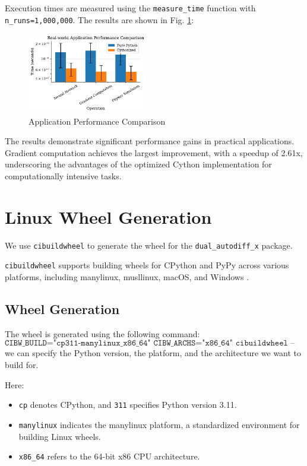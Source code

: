 \documentclass{article}
\begin{document}
Execution times are measured using the \texttt{measure\_time} function with \texttt{n\_runs=1,000,000}. The results are shown in Fig. \ref{fig:app}:

\begin{figure}[!htbp]
\centering
\includegraphics[width=0.47\textwidth]{./images/app_performance.pdf}
\caption{Application Performance Comparison}
\label{fig:app}
\end{figure}

The results demonstrate significant performance gains in practical applications. Gradient computation achieves the largest improvement, with a speedup of 2.61x, underscoring the advantages of the optimized Cython implementation for computationally intensive tasks.

\section{Linux Wheel Generation}

We use \texttt{cibuildwheel} to generate the wheel for the \texttt{dual\_autodiff\_x} package.

\texttt{cibuildwheel} supports building wheels for CPython and PyPy across various platforms, including manylinux, musllinux, macOS, and Windows \cite{cibuildwheel}.

\subsection{Wheel Generation}

The wheel is generated using the following command:
\[
\texttt{CIBW\_BUILD="cp311-manylinux\_x86\_64" CIBW\_ARCHS="x86\_64" cibuildwheel --platform linux}
\]
we can specify the Python version, the platform, and the architecture we want to build for.

Here:

\begin{itemize} 
    \item \texttt{cp} denotes CPython, and \texttt{311} specifies Python version 3.11. 
    \item \texttt{manylinux} indicates the manylinux platform, a standardized environment for building Linux wheels. 
    \item \texttt{x86\_64} refers to the 64-bit x86 CPU architecture. \end{itemize}
\end{document}
